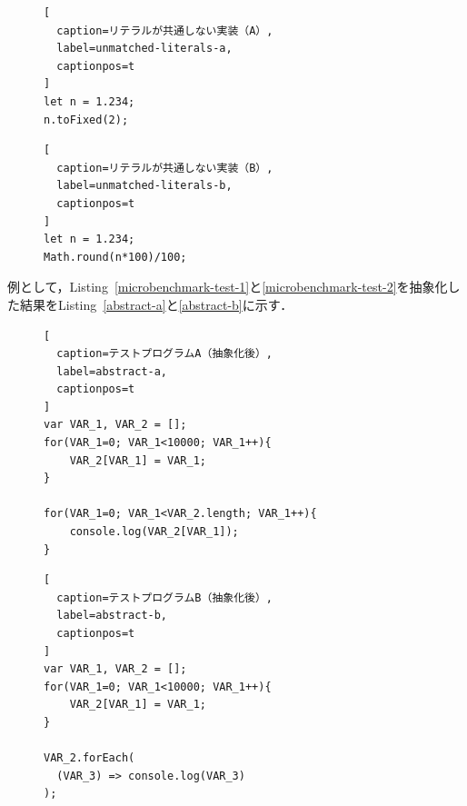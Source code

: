 \documentclass[11pt]{jreport}
\newcommand{\fix}[1]{#1}
\begin{document}
\begin{figure}[t]
\captionsetup{name=Listing}
\hspace{0.04\columnwidth}
\begin{minipage}[b]{0.445\linewidth}
\begin{lstlisting}[
  caption=リテラルが共通しない実装（A）,
  label=unmatched-literals-a,
  captionpos=t
]
let n = 1.234;
n.toFixed(2);
\end{lstlisting}
\end{minipage}
\hspace{0.059\columnwidth}
\begin{minipage}[b]{0.445\linewidth}
\begin{lstlisting}[
  caption=リテラルが共通しない実装（B）,
  label=unmatched-literals-b,
  captionpos=t
]
let n = 1.234;
Math.round(n*100)/100;
\end{lstlisting}
\end{minipage}
\end{figure}


例として，\fix{Listing~}\ref{microbenchmark-test-1}と\ref{microbenchmark-test-2}を抽象化した結果をListing~\ref{abstract-a}と\ref{abstract-b}に示す．


\begin{figure}[t]
\captionsetup{name=Listing}
\hspace{0.04\columnwidth}
\begin{minipage}[b]{0.96\linewidth}
\begin{lstlisting}[
  caption=テストプログラムA（抽象化後）,
  label=abstract-a,
  captionpos=t
]
var VAR_1, VAR_2 = [];
for(VAR_1=0; VAR_1<10000; VAR_1++){
    VAR_2[VAR_1] = VAR_1;
}

for(VAR_1=0; VAR_1<VAR_2.length; VAR_1++){
    console.log(VAR_2[VAR_1]);
}
\end{lstlisting}
\end{minipage}
\end{figure}

\begin{figure}[t]
\captionsetup{name=Listing}
\hspace{0.04\columnwidth}
\begin{minipage}[b]{0.96\linewidth}
\begin{lstlisting}[
  caption=テストプログラムB（抽象化後）,
  label=abstract-b,
  captionpos=t
]
var VAR_1, VAR_2 = [];
for(VAR_1=0; VAR_1<10000; VAR_1++){
    VAR_2[VAR_1] = VAR_1;
}

VAR_2.forEach(
  (VAR_3) => console.log(VAR_3)
);
\end{lstlisting}
\end{minipage}
\end{figure}
\end{document}
